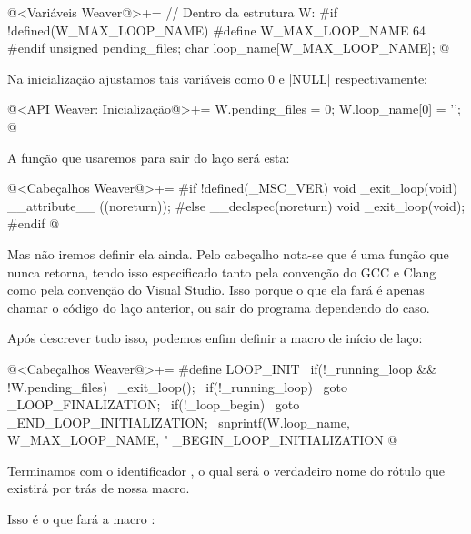 \iniciocodigo
@<Variáveis Weaver@>+=
// Dentro da estrutura W:
#if !defined(W_MAX_LOOP_NAME)
#define W_MAX_LOOP_NAME 64
#endif
unsigned pending_files;
char loop_name[W_MAX_LOOP_NAME];
@
\fimcodigo

Na inicialização ajustamos tais variáveis como 0 e |NULL|
respectivamente:

\iniciocodigo
@<API Weaver: Inicialização@>+=
W.pending_files = 0;
W.loop_name[0] = '\0';
@
\fimcodigo

A função que usaremos para sair do laço será esta:

\iniciocodigo
@<Cabeçalhos Weaver@>+=
#if !defined(_MSC_VER)
void _exit_loop(void) __attribute__ ((noreturn));
#else
__declspec(noreturn) void _exit_loop(void);
#endif
@
\fimcodigo

Mas não iremos definir ela ainda. Pelo cabeçalho nota-se que é uma
função que nunca retorna, tendo isso especificado tanto pela convenção
do GCC e Clang como pela convenção do Visual Studio. Isso porque o que
ela fará é apenas chamar o código do laço anterior, ou sair do
programa dependendo do caso.

Após descrever tudo isso, podemos enfim definir a macro de início de
laço:

\iniciocodigo
@<Cabeçalhos Weaver@>+=
#define LOOP_INIT                                                   \
  if(!_running_loop && !W.pending_files)                             \
    _exit_loop();                                                    \
  if(!_running_loop)                                                 \
   goto _LOOP_FINALIZATION;                                          \
  if(!_loop_begin)                                                   \
    goto _END_LOOP_INITIALIZATION;                                   \
  snprintf(W.loop_name, W_MAX_LOOP_NAME, "%
  _BEGIN_LOOP_INITIALIZATION
@
\fimcodigo

Terminamos com o
identificador \monoespaco{\_BEGIN\_LOOP\_INITIALIZATION}, o qual será
o verdadeiro nome do rótulo que existirá por trás de nossa macro.


Isso é o que fará a macro :

